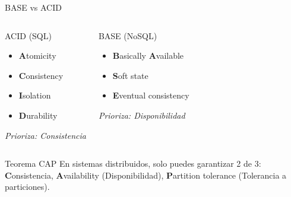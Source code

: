 \documentclass[aspectratio=169]{beamer}
\begin{document}
\begin{frame}{BASE vs ACID}
    \begin{columns}[t]
        \begin{block}{ACID (SQL)}
            \begin{itemize}
                \item \textbf{A}tomicity
                \item \textbf{C}onsistency
                \item \textbf{I}solation
                \item \textbf{D}urability
            \end{itemize}
            \vspace{0.2cm}
            \textit{Prioriza: Consistencia}
        \end{block}
        
        \begin{block}{BASE (NoSQL)}
            \begin{itemize}
                \item \textbf{B}asically \textbf{A}vailable
                \item \textbf{S}oft state
                \item \textbf{E}ventual consistency
            \end{itemize}
            \vspace{0.2cm}
            \textit{Prioriza: Disponibilidad}
        \end{block}
    \end{columns}
    
    \vspace{0.5cm}
    \begin{alertblock}{Teorema CAP}
        En sistemas distribuidos, solo puedes garantizar 2 de 3: \textbf{C}onsistencia, \textbf{A}vailability (Disponibilidad), \textbf{P}artition tolerance (Tolerancia a particiones).
    \end{alertblock}
\end{frame}
\end{document}
